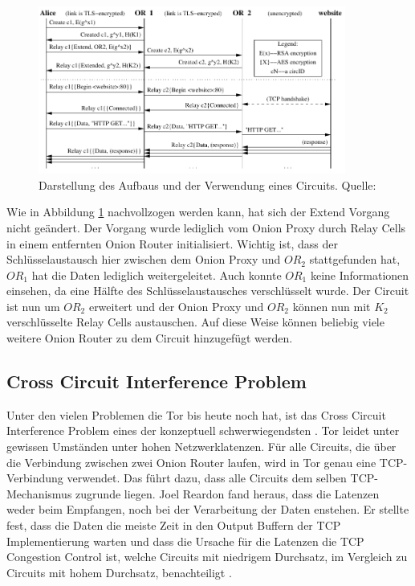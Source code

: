 \documentclass[fleqn,envcountsame,runningheads,10pt,a4paper]{llncs}
\begin{document}
\begin{figure}[h]
  \begin{center}
    \includegraphics[width=0.9\textwidth]{pics/construction.pdf}
    \caption{Darstellung des Aufbaus und der Verwendung eines Circuits. Quelle: \cite{tor}}
    \label{fig:construction} 
  \end{center} 
\end{figure}

Wie in Abbildung \ref{fig:construction} nachvollzogen werden kann, hat sich der 
Extend Vorgang nicht geändert. Der Vorgang wurde lediglich vom Onion Proxy durch 
Relay Cells in einem entfernten Onion Router initialisiert. Wichtig ist, dass 
der Schlüsselaustausch hier zwischen dem Onion Proxy und $\textit{OR}_2$ 
stattgefunden hat, $\textit{OR}_1$ hat die Daten lediglich weitergeleitet. Auch 
konnte $\textit{OR}_1$ keine Informationen einsehen, da eine Hälfte des 
Schlüsselaustausches verschlüsselt wurde. Der Circuit ist nun um $\textit{OR}_2$ 
erweitert und der Onion Proxy und $\textit{OR}_2$ können nun mit $K_2$ 
verschlüsselte Relay Cells austauschen. Auf diese Weise können beliebig viele 
weitere Onion Router zu dem Circuit hinzugefügt werden.

\newpage

\subsection{Cross Circuit Interference Problem}
\label{sec:crosscircuitinterference} 

Unter den vielen Problemen die Tor bis heute noch hat, ist das Cross Circuit 
Interference Problem eines der konzeptuell schwerwiegendsten 
\cite{tor_improvements}. Tor leidet unter gewissen Umständen unter hohen 
Netzwerklatenzen. Für alle Circuits, die über die Verbindung zwischen zwei Onion 
Router laufen, wird in Tor genau eine TCP-Verbindung verwendet. Das führt dazu, 
dass alle Circuits dem selben TCP-Mechanismus zugrunde liegen. Joel Reardon fand 
heraus, dass die Latenzen weder beim Empfangen, noch bei der Verarbeitung der 
Daten enstehen. Er stellte fest, dass die Daten die meiste Zeit in den Output 
Buffern der TCP Implementierung warten und dass die Ursache für die Latenzen die 
TCP Congestion Control ist, welche Circuits mit niedrigem Durchsatz, im 
Vergleich zu Circuits mit hohem Durchsatz, benachteiligt 
\cite{tcp-over-dtls-thesis,tcp-over-dtls}.
\end{document}
